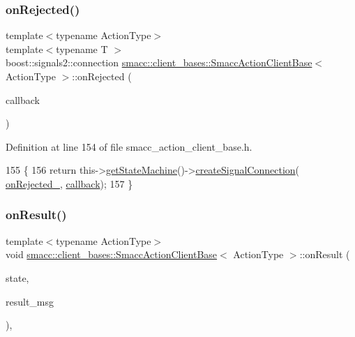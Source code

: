 \subsubsection{\texorpdfstring{on\+Rejected()}{onRejected()}\hspace{0.1cm}{\footnotesize\ttfamily [2/2]}}
{\footnotesize\ttfamily template$<$typename Action\+Type$>$ \\
template$<$typename T $>$ \\
boost\+::signals2\+::connection \hyperlink{classsmacc_1_1client__bases_1_1SmaccActionClientBase}{smacc\+::client\+\_\+bases\+::\+Smacc\+Action\+Client\+Base}$<$ Action\+Type $>$\+::on\+Rejected (\begin{DoxyParamCaption}\item[{std\+::function$<$ void(Result\+Const\+Ptr \&)$>$}]{callback }\end{DoxyParamCaption})\hspace{0.3cm}{\ttfamily [inline]}}



Definition at line 154 of file smacc\+\_\+action\+\_\+client\+\_\+base.\+h.


\begin{DoxyCode}
155     \{
156         \textcolor{keywordflow}{return} this->\hyperlink{classsmacc_1_1ISmaccClient_aec51d4712404cb9882b86e4c854bb93a}{getStateMachine}()->\hyperlink{classsmacc_1_1ISmaccStateMachine_adf0f42ade0c65cc471960fe2a7c42da2}{createSignalConnection}(
      \hyperlink{classsmacc_1_1client__bases_1_1SmaccActionClientBase_a4c878cbf2684701323e2b36668f7d721}{onRejected\_}, \hyperlink{servers_2opencv__perception__node_2opencv__perception__node_8cpp_a050e697bd654facce10ea3f6549669b3}{callback});
157     \}
\end{DoxyCode}
\mbox{\label{classsmacc_1_1client__bases_1_1SmaccActionClientBase_a39b897cf72ee070e4172cf76cdd53d5e}} 
\subsubsection{\texorpdfstring{on\+Result()}{onResult()}}
{\footnotesize\ttfamily template$<$typename Action\+Type$>$ \\
void \hyperlink{classsmacc_1_1client__bases_1_1SmaccActionClientBase}{smacc\+::client\+\_\+bases\+::\+Smacc\+Action\+Client\+Base}$<$ Action\+Type $>$\+::on\+Result (\begin{DoxyParamCaption}\item[{const Simple\+Client\+Goal\+State \&}]{state,  }\item[{const Result\+Const\+Ptr \&}]{result\+\_\+msg }\end{DoxyParamCaption})\hspace{0.3cm}{\ttfamily [inline]}, {\ttfamily [protected]}}



